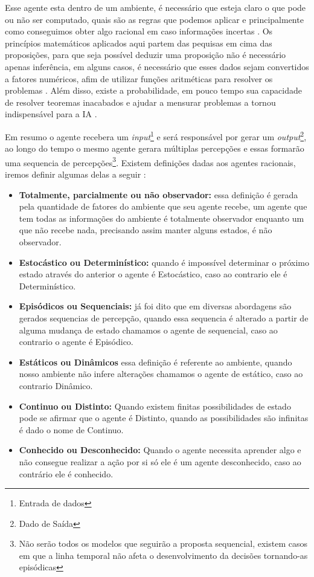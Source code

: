 Esse agente esta dentro de um ambiente, é necessário que esteja claro o que pode ou não ser computado, quais são as regras que podemos aplicar e principalmente como conseguimos obter algo racional em caso informações incertas \cite[7]{russell2003artificial}. Os princípios matemáticos aplicados aqui partem das pequisas em cima das proposições, para que seja possível deduzir uma proposição não é necessário apenas inferência, em alguns casos, é necessário que esses dados sejam convertidos a fatores numéricos, afim de utilizar funções aritméticas para resolver os problemas \cite[2-4]{boole1854investigation}. Além disso, existe a probabilidade, em pouco tempo sua capacidade de resolver teoremas inacabados e ajudar a mensurar problemas a tornou indispensável para a IA \cite[9]{russell2003artificial}.

Em resumo o agente recebera um \textit{input}\footnote{Entrada de dados} e será responsável por gerar um \textit{output}\footnote{Dado de Saída}, ao longo do tempo o mesmo agente gerara múltiplas percepções e essas formarão uma sequencia de percepções\footnote{Não serão todos os modelos que seguirão a proposta sequencial, existem casos em que a linha temporal não afeta o desenvolvimento da decisões tornando-as episódicas}. \cite[34-35]{russell2003artificial} Existem definições dadas aos agentes racionais, iremos definir algumas delas a seguir \cite[42-45]{russell2003artificial}:

\begin{itemize}
 \item \textbf{Totalmente, parcialmente ou não observador:} essa definição é gerada pela quantidade de fatores do ambiente que seu agente recebe, um agente que tem todas as informações do ambiente é totalmente observador enquanto um que não recebe nada, precisando assim manter alguns estados, é não observador.
 \item \textbf{Estocástico ou Determinístico:} quando é impossível determinar o próximo estado através do anterior o agente é Estocástico, caso ao contrario ele é Determinístico.
 \item \textbf{Episódicos ou Sequenciais:} já foi dito que em diversas abordagens são gerados sequencias de percepção, quando essa sequencia é alterado a partir de alguma mudança de estado chamamos o agente de sequencial, caso ao contrario o agente é Episódico.
 \item \textbf{Estáticos ou Dinâmicos} essa definição é referente ao ambiente, quando nosso ambiente não infere alterações chamamos o agente de estático, caso ao contrario Dinâmico.
 \item \textbf{Continuo ou Distinto:} Quando existem finitas possibilidades de estado pode se afirmar que o agente é Distinto, quando as possibilidades são infinitas é dado o nome de Continuo.
 \item \textbf{Conhecido ou Desconhecido:} Quando o agente necessita aprender algo e não consegue realizar a ação por si só ele é um agente desconhecido, caso ao contrário ele é conhecido.
\end{itemize}

